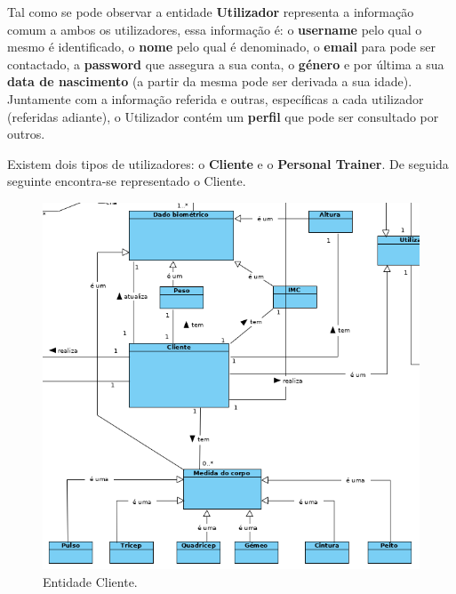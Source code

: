 \hspace{5mm} Tal como se pode observar a entidade \textbf{Utilizador} representa a informação comum a ambos os utilizadores, essa informação é: o \textbf{username} pelo qual o mesmo é identificado, o \textbf{nome} pelo qual é denominado, o \textbf{email} para pode ser contactado, a \textbf{password} que assegura a sua conta, o \textbf{género} e por última a sua \textbf{data de nascimento} (a partir da mesma pode ser derivada a sua idade). Juntamente com a informação referida e outras, específicas a cada utilizador (referidas adiante), o Utilizador contém um \textbf{perfil} que pode ser consultado por outros.

\hspace{5mm} Existem dois tipos de utilizadores: o \textbf{Cliente} e o \textbf{Personal Trainer}. De seguida seguinte encontra-se representado o Cliente.

\begin{figure}[H]
    \centering
    \includegraphics[scale=0.50]{images/modelação/cliente.png}
    \caption{Entidade Cliente.}
    \label{fig:interfaceperfilptbycliente}
\end{figure}

